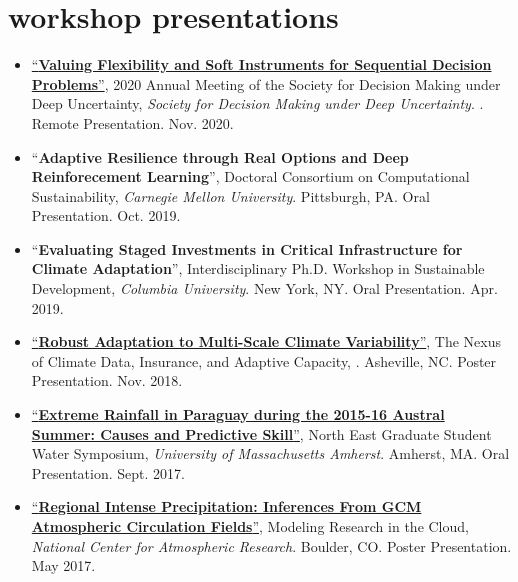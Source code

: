 \documentclass[10pt,oneside]{article}
\begin{document}
\mbox{}\vspace{-\dimexpr\baselineskip\relax}
\vspace*{-1em}
\printbibliography[type=inproceedings, heading=none]


\section{workshop presentations}

\mbox{}\vspace{-\dimexpr\baselineskip\relax}

\begin{itemize}[label={}]

  \item \href{https://2020.deepuncertainty.org/program}{\enquote{\textbf{Valuing Flexibility and Soft Instruments for Sequential Decision Problems}}}, 2020 Annual Meeting of the Society for Decision Making under Deep Uncertainty,  \textit{Society for Decision Making under Deep Uncertainty}. . Remote Presentation. Nov. 2020.

  \item \enquote{\textbf{Adaptive Resilience through Real Options and Deep Reinforecement Learning}}, Doctoral Consortium on Computational Sustainability,  \textit{Carnegie Mellon University}. Pittsburgh,  PA. Oral Presentation. Oct. 2019.

  \item \enquote{\textbf{Evaluating Staged Investments in Critical Infrastructure for Climate Adaptation}}, Interdisciplinary Ph.D. Workshop in Sustainable Development,  \textit{Columbia University}. New York, NY. Oral Presentation. Apr. 2019.

  \item \href{https://doi.org/10.6084/m9.figshare.8277002.v1}{\enquote{\textbf{Robust Adaptation to Multi-Scale Climate Variability}}}, The Nexus of Climate Data, Insurance, and Adaptive Capacity,  \textit{}. Asheville, NC. Poster Presentation. Nov. 2018.

  \item \href{https://doi.org/10.6084/m9.figshare.8277128.v2}{\enquote{\textbf{Extreme Rainfall in Paraguay during the 2015-16 Austral Summer: Causes and Predictive Skill}}}, North East Graduate Student Water Symposium,  \textit{University of Massachusetts Amherst}. Amherst, MA. Oral Presentation. Sept. 2017.

  \item \href{https://doi.org/10.6084/m9.figshare.8277167.v1}{\enquote{\textbf{Regional Intense Precipitation: Inferences From GCM Atmospheric Circulation Fields}}}, Modeling Research in the Cloud,  \textit{National Center for Atmospheric Research}. Boulder, CO. Poster Presentation. May 2017.


\end{itemize}
\end{document}

